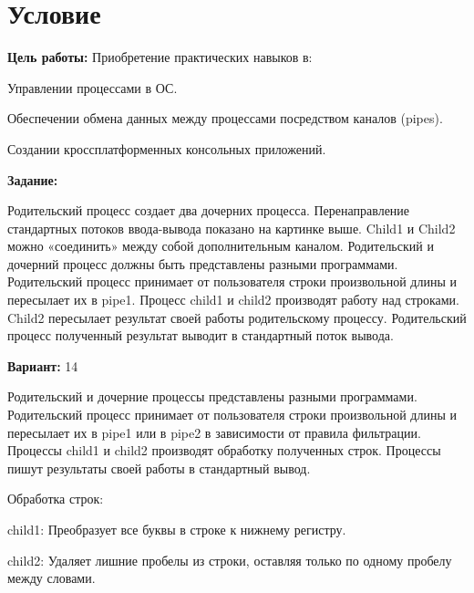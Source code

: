 \section{Условие}

{\bfseries Цель работы:}
Приобретение практических навыков в:

Управлении процессами в ОС.

Обеспечении обмена данных между процессами посредством каналов (pipes).

Создании кроссплатформенных консольных приложений.

{\bfseries Задание:}

Родительский процесс создает два дочерних процесса. Перенаправление стандартных потоков
ввода-вывода показано на картинке выше. Child1 и Child2 можно «соединить» между собой
дополнительным каналом. Родительский и дочерний процесс должны быть представлены
разными программами.
Родительский процесс принимает от пользователя строки произвольной длины и пересылает их в
pipe1. Процесс child1 и child2 производят работу над строками. Child2 пересылает результат своей
работы родительскому процессу. Родительский процесс полученный результат выводит в
стандартный поток вывода.

{\bfseries Вариант:} 14

Родительский и дочерние процессы представлены разными программами. Родительский процесс принимает от пользователя строки произвольной длины и пересылает их в pipe1 или в pipe2 в зависимости от правила фильтрации. Процессы child1 и child2 производят обработку полученных строк. Процессы пишут результаты своей работы в стандартный вывод.

Обработка строк:

child1: Преобразует все буквы в строке к нижнему регистру.

child2: Удаляет лишние пробелы из строки, оставляя только по одному пробелу между словами.



